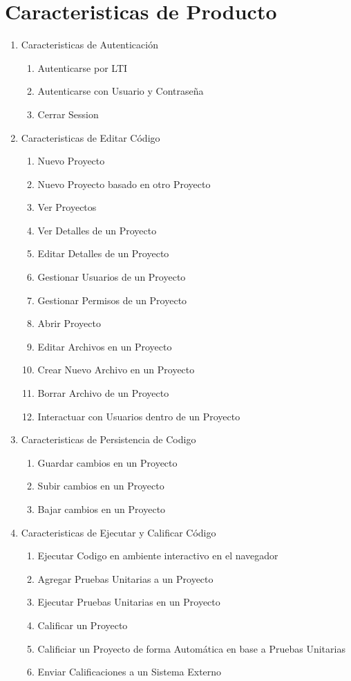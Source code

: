 \section{Caracteristicas de Producto}
\begin{enumerate}
	\item Caracteristicas de Autenticación
    	\begin{enumerate}
			\item Autenticarse por LTI
			\item Autenticarse con Usuario y Contraseña
			\item Cerrar Session   
    	\end{enumerate}
    
	\item Caracteristicas de Editar Código
    	\begin{enumerate}
			\item Nuevo Proyecto
			\item Nuevo Proyecto basado en otro Proyecto
			\item Ver Proyectos
			\item Ver Detalles de un Proyecto
			\item Editar Detalles de un Proyecto
			\item Gestionar Usuarios de un Proyecto
			\item Gestionar Permisos de un Proyecto
			\item Abrir Proyecto
			\item Editar Archivos en un Proyecto
			\item Crear Nuevo Archivo en un Proyecto
			\item Borrar Archivo de un Proyecto
			\item Interactuar con Usuarios dentro de un Proyecto
    	\end{enumerate}
    
	\item Caracteristicas de Persistencia de Codigo
    	\begin{enumerate}
			\item Guardar cambios en un Proyecto
			\item Subir cambios en un Proyecto
			\item Bajar cambios en un Proyecto
    	\end{enumerate}
	\item Caracteristicas de Ejecutar y Calificar Código
    	\begin{enumerate}
			\item Ejecutar Codigo en ambiente interactivo en el navegador
			\item Agregar Pruebas Unitarias a un Proyecto
			\item Ejecutar Pruebas Unitarias en un Proyecto
			\item Calificar un Proyecto
			\item Calificiar un Proyecto de forma Automática en base a Pruebas Unitarias
			\item Enviar Calificaciones a un Sistema Externo
    	\end{enumerate}
\end{enumerate}

